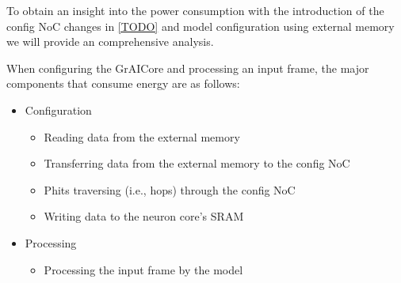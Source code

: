 To obtain an insight into the power consumption with the introduction of the config NoC changes in \cref{TODO} and model configuration using external memory we will provide an comprehensive analysis.

When configuring the GrAICore and processing an input frame, the major components that consume energy are as follows:
\begin{itemize}
    \item Configuration
    \begin{itemize}
        \item Reading data from the external memory
        \item Transferring data from the external memory to the config NoC
        \item Phits traversing (i.e., hops) through the config NoC
        \item Writing data to the neuron core's SRAM
    \end{itemize}
    \item Processing
    \begin{itemize}
        \item Processing the input frame by the model
    \end{itemize}
\end{itemize}
